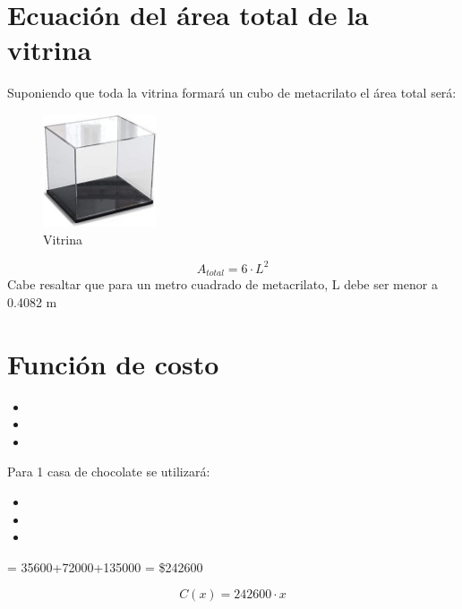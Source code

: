 \documentclass{article}
\theoremstyle{mytheoremstyle}
\theoremstyle{mytheoremstyle}
\theoremstyle{myproblemstyle}
\begin{document}
\section{Ecuación del área total de la vitrina}

Suponiendo que toda la vitrina formará un cubo de metacrilato el área total será:
\newline
\begin{figure}[H]
    \centering
    \includegraphics[width=0.3\textwidth]{3.jpg}
    \caption{Vitrina}
\end{figure}

\begin{equation}
    A_{total}= 6 \cdot L  ^{2}
\end{equation}
Cabe resaltar que para un metro cuadrado de metacrilato, L debe ser menor a 0.4082 m
\newpage
\section{Función de costo}

\begin{itemize}
\item {}
\item {}
\item {}
\end{itemize}
Para 1 casa de chocolate se utilizará:
\begin{itemize}
    \item {}
    \item {}
    \item {}
    \end{itemize}
 = 35600+72000+135000 = \$242600

\begin{equation}
    C(x) = 242600 \cdot x
\end{equation}
\end{document}
